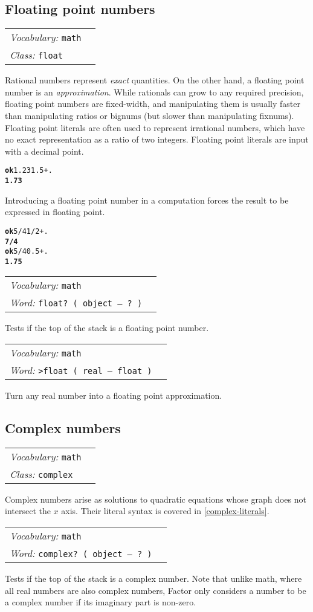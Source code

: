 \documentclass{book}
\newcommand{\vocabulary}[1]{\emph{Vocabulary:} \texttt{#1}&\\}
\newcommand{\ordinaryword}[2]{\index{\texttt{#1}}\emph{Word:} \texttt{#2}&\\}
\newcommand{\classword}[1]{\index{\texttt{#1}}\emph{Class:} \texttt{#1}&\\}
\newcommand{\predword}[1]{\ordinaryword{#1}{#1~( object -- ?~)}}
\newcommand{\wordtable}[1]{


\begin{tabularx}{12cm}{lX}
\hline
#1
\hline
\end{tabularx}

}
\begin{document}
\subsection{Floating point numbers}\label{floats}

\wordtable{
\vocabulary{math}
\classword{float}
}
\newcommand{\realglos}{}
\realglos
\floatglos

Rational numbers represent \emph{exact} quantities. On the other hand, a floating point number is an \emph{approximation}. While rationals can grow to any required precision, floating point numbers are fixed-width, and manipulating them is usually faster than manipulating ratios or bignums (but slower than manipulating fixnums). Floating point literals are often used to represent irrational numbers, which have no exact representation as a ratio of two integers. Floating point literals are input with a decimal point.

\begin{alltt}
\textbf{ok} 1.23 1.5 + .
\textbf{1.73}
\end{alltt}

Introducing a floating point number in a computation forces the result to be expressed in floating point.

\begin{alltt}
\textbf{ok} 5/4 1/2 + .
\textbf{7/4}
\textbf{ok} 5/4 0.5 + .
\textbf{1.75}
\end{alltt}

\wordtable{
\vocabulary{math}
\predword{float?}
}
Tests if the top of the stack is a floating point number.
\wordtable{
\vocabulary{math}
\ordinaryword{>float}{>float ( real -- float )}
}
Turn any real number into a floating point approximation.

\subsection{Complex numbers}\label{complex-numbers}

\wordtable{
\vocabulary{math}
\classword{complex}
}
Complex numbers arise as solutions to quadratic equations whose graph does not intersect the $x$ axis. Their literal syntax is covered in \ref{complex-literals}.

\wordtable{
\vocabulary{math}
\predword{complex?}
}
Tests if the top of the stack is a complex number. Note that unlike math, where all real numbers are also complex numbers, Factor only considers a number to be a complex number if its imaginary part is non-zero.
\end{document}
